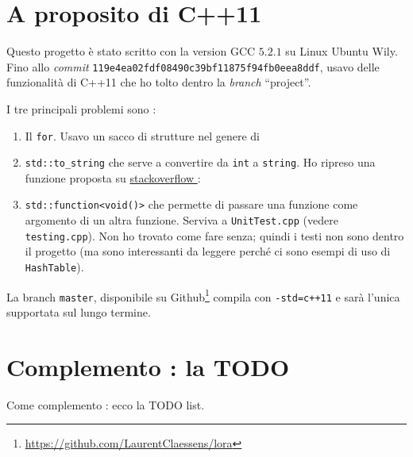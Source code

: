 \documentclass[a4paper,12pt]{article}
\newcommand{\info}[1]{\texttt{#1}}
\begin{document}
 \section{A proposito di C++11}

Questo progetto è stato scritto con la version GCC \( 5.2.1\) su Linux Ubuntu Wily. Fino allo \emph{commit} \info{119e4ea02fdf08490c39bf11875f94fb0eea8ddf}, usavo delle funzionalità di C++11 che ho tolto dentro la \emph{branch} ``project''.

I tre principali problemi sono :
\begin{enumerate}
    \item
        Il \info{for}. Usavo un sacco di strutture nel genere di



\item \info{std::to\_string} che serve a convertire da \info{int} a \info{string}. Ho ripreso una funzione proposta su \href{  http://stackoverflow.com/questions/5590381/easiest-way-to-convert-int-to-string-in-c}{ stackoverflow } :



\item
    \info{std::function<void()>} che permette di passare una funzione come argomento di un altra funzione. Serviva a \info{UnitTest.cpp} (vedere \info{testing.cpp}). Non ho trovato come fare senza; quindi i testi non sono dentro il progetto (ma sono interessanti da leggere perché ci sono esempi di uso di \info{HashTable}).

\end{enumerate}

La branch \info{master}, disponibile su Github\footnote{\url{https://github.com/LaurentClaessens/lora}} compila con \info{-std=c++11} e sarà l'unica supportata sul lungo termine.

\section{Complemento : la TODO}

Come complemento : ecco la TODO list.


\end{document}
